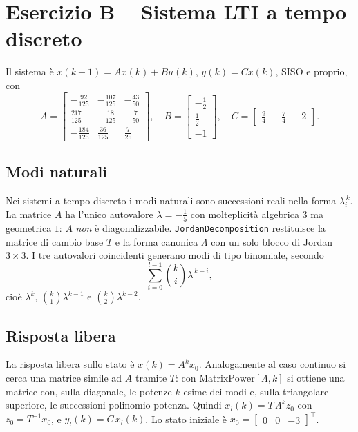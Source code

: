 \section{Esercizio B -- Sistema LTI a tempo discreto}

Il sistema è $x(k+1)=Ax(k)+Bu(k)$, $y(k)=Cx(k)$, SISO e proprio, con
\[
A=\begin{bmatrix}
-\tfrac{92}{125} & -\tfrac{107}{125} & -\tfrac{43}{50}\\[2pt]
\tfrac{217}{125} & -\tfrac{18}{125} & -\tfrac{7}{50}\\[2pt]
-\tfrac{184}{125} & \tfrac{36}{125} & \tfrac{7}{25}
\end{bmatrix},\quad
B=\begin{bmatrix}-\tfrac12\\[2pt]\tfrac12\\[2pt]-1\end{bmatrix},\quad
C=\begin{bmatrix}\tfrac94 & -\tfrac74 & -2\end{bmatrix}.
\]

\subsection{Modi naturali}
Nei sistemi a tempo discreto i modi naturali sono successioni reali nella forma
$\lambda_i^{\,k}$. La matrice $A$ ha l'unico autovalore $\lambda=-\tfrac15$ con
molteplicità algebrica $3$ ma geometrica $1$: $A$ \emph{non} è diagonalizzabile.
\texttt{JordanDecomposition} restituisce la matrice di cambio base $T$ e la forma
canonica $\Lambda$ con un solo blocco di Jordan $3\times3$. I tre autovalori
coincidenti generano modi di tipo binomiale, secondo
\[
\sum_{i=0}^{l-1}\binom{k}{i}\lambda^{\,k-i},
\]
cioè $\lambda^k$, $\binom{k}{1}\lambda^{k-1}$ e $\binom{k}{2}\lambda^{k-2}$.


\subsection{Risposta libera}
La risposta libera sullo stato è $x(k)=A^k x_0$. Analogamente al caso continuo si cerca
una matrice simile ad $A$ tramite $T$: con $\mathrm{MatrixPower}[\Lambda,k]$ si ottiene
una matrice con, sulla diagonale, le potenze $k$-esime dei modi e, sulla triangolare
superiore, le successioni polinomio-potenza. Quindi $x_l(k)=T\,\Lambda^k z_0$ con
$z_0=T^{-1}x_0$, e $y_l(k)=C\,x_l(k)$. Lo stato iniziale è
$x_0=\begin{bmatrix}0&0&-3\end{bmatrix}^{\!\top}$.

